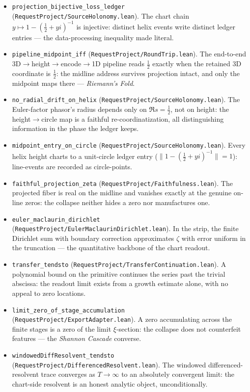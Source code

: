 \begin{itemize}
Without the ledger the geometric projection is provably non-injective ---
the ledger does real work; the faithfulness results are not vacuous.
\item \texttt{projection\_bijective\_loss\_ledger}
(\texttt{RequestProject/SourceHolonomy.lean}). The chart chain
\(y\mapsto1-(\tfrac12+yi)^{-1}\) is injective: distinct helix events write
distinct ledger entries --- the data-processing inequality made literal.
\item \texttt{pipeline\_midpoint\_iff}
(\texttt{RequestProject/RoundTrip.lean}). The end-to-end
3D\(\to\)height\(\to\)encode\(\to\)1D pipeline reads \(\tfrac12\) exactly
when the retained 3D coordinate is \(\tfrac12\): the midline address
survives projection intact, and only the midpoint maps there --- \emph{Riemann's Fold}.
\item \texttt{no\_radial\_drift\_on\_helix}
(\texttt{RequestProject/SourceHolonomy.lean}). The Euler-factor phasor's
radius depends only on \(\Re s=\tfrac12\), not on height: the
height\(\to\)circle map is a faithful re-coordinatization, all
distinguishing information in the phase the ledger keeps.
\item \texttt{midpoint\_entry\_on\_circle}
(\texttt{RequestProject/SourceHolonomy.lean}). Every helix height charts to
a unit-circle ledger entry (\(\|1-(\tfrac12+yi)^{-1}\|=1\)): line-events are
recorded as circle-points.
\item \texttt{faithful\_projection\_zeta}
(\texttt{RequestProject/Faithfulness.lean}). The projected fiber is real on
the midline and vanishes exactly at the genuine on-line zeros: the collapse
neither hides a zero nor manufactures one.
\item \texttt{euler\_maclaurin\_dirichlet}
(\texttt{RequestProject/EulerMaclaurinDirichlet.lean}). In the strip, the
finite Dirichlet sum with boundary correction approximates \(\zeta\) with
error uniform in the truncation --- the quantitative backbone of the chart
readout.
\item \texttt{transfer\_tendsto}
(\texttt{RequestProject/TransferContinuation.lean}). A polynomial bound on
the primitive continues the series past the trivial abscissa: the readout
limit exists from a growth estimate alone, with no appeal to zero locations.
\item \texttt{limit\_zero\_of\_stage\_accumulation}
(\texttt{RequestProject/ExportAdapter.lean}). A zero accumulating across the
finite stages is a zero of the limit \(\xi\)-section: the collapse does not
counterfeit features --- the \emph{Shannon Cascade} converse.
\item \texttt{windowedDiffResolvent\_tendsto}
(\texttt{RequestProject/DifferencedResolvent.lean}). The windowed
differenced-resolvent trace converges as \(T\to\infty\) to an absolutely
convergent limit: the chart-side resolvent is an honest analytic object,
unconditionally.
\end{itemize}


